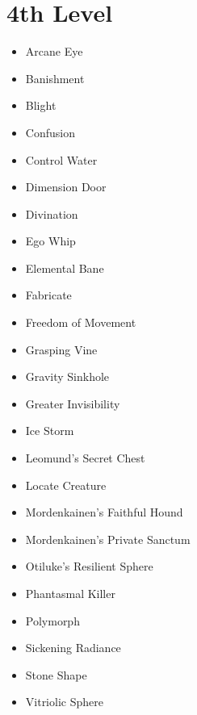 \documentclass[a4paper,10pt,twoside,twocolumn, bg=print]{dndbook} %
\begin{document}
		\section{4th Level}
			\begin{itemize}
				\item Arcane Eye
				\item Banishment
				\item Blight
				\item Confusion
				\item Control Water
				\item Dimension Door
				\item Divination
				\item Ego Whip
				\item Elemental Bane
				\item Fabricate
				\item Freedom of Movement
				\item Grasping Vine
				\item Gravity Sinkhole
				\item Greater Invisibility
				\item Ice Storm
				\item Leomund's Secret Chest
				\item Locate Creature
				\item Mordenkainen's Faithful Hound
				\item Mordenkainen's Private Sanctum
				\item Otiluke's Resilient Sphere
				\item Phantasmal Killer
				\item Polymorph
				\item Sickening Radiance
				\item Stone Shape
				\item Vitriolic Sphere
			\end{itemize}
\end{document}
